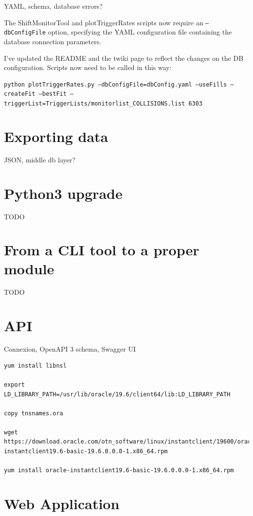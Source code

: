 YAML, schema, database errors?

The ShiftMonitorTool and plotTriggerRates scripts now require an \texttt{--dbConfigFile} option, specifying the YAML configuration file containing the database connection parameters.

I've updated the README and the twiki page to reflect the changes on the DB configuration. Scripts now need to be called in this way:

\texttt{python plotTriggerRates.py --dbConfigFile=dbConfig.yaml --useFills --createFit --bestFit --triggerList=TriggerLists/monitorlist\_COLLISIONS.list 6303}

\section{Exporting data}

JSON, middle db layer?

\section{Python3 upgrade}

TODO

\section{From a CLI tool to a proper module}

TODO

\section{API}

Connexion, OpenAPI 3 schema, Swagger UI
\begin{verbatim}
yum install libnsl

export LD_LIBRARY_PATH=/usr/lib/oracle/19.6/client64/lib:LD_LIBRARY_PATH

copy tnsnames.ora

wget https://download.oracle.com/otn_software/linux/instantclient/19600/oracle-instantclient19.6-basic-19.6.0.0.0-1.x86_64.rpm

yum install oracle-instantclient19.6-basic-19.6.0.0.0-1.x86_64.rpm
\end{verbatim}

\section{Web Application}

